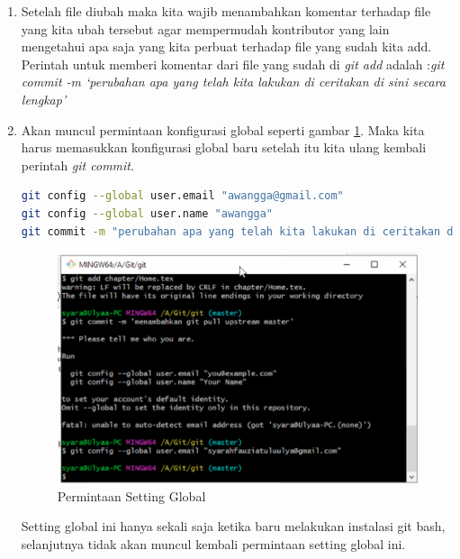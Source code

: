 \begin{enumerate}
\item Setelah file diubah maka kita wajib menambahkan komentar terhadap file yang kita ubah tersebut agar mempermudah kontributor yang lain mengetahui apa saja yang kita perbuat terhadap file yang sudah kita add. Perintah untuk memberi komentar dari file yang sudah di \textit{git add} adalah :\textit{git commit -m `perubahan apa yang telah kita lakukan di ceritakan di sini secara lengkap'}
\item Akan muncul permintaan konfigurasi global seperti gambar \ref{configglobal}. Maka kita harus memasukkan konfigurasi global baru setelah itu kita ulang kembali perintah \textit{git commit}.
\begin{lstlisting}[language=sh, caption=Perintah Sinkronisasi dengan repo asal,breaklines]
git config --global user.email "awangga@gmail.com"
git config --global user.name "awangga"
git commit -m "perubahan apa yang telah kita lakukan di ceritakan di sini secara lengkap"
\end{lstlisting}
\begin{figure}[!htbp]
\centerline{\includegraphics[width=.75\textwidth]{Figures/configglobal}}
\caption{Permintaan Setting Global}
\label{configglobal}
\end{figure}
Setting global ini hanya sekali saja ketika baru melakukan instalasi git bash, selanjutnya tidak akan muncul kembali permintaan setting global ini.


\end{enumerate}
